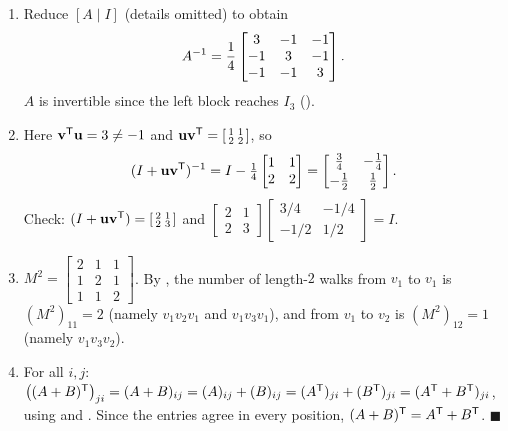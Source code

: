 \begin{enumerate}[label=\textbf{1.\arabic*},leftmargin=2.6em,itemsep=8pt]
\item Reduce $[A\mid I]$ (details omitted) to obtain
\[
A^{-1}=\frac14\begin{bmatrix}3&-1&-1\\-1&3&-1\\-1&-1&3\end{bmatrix}.
\]
$A$ is invertible since the left block reaches $I_3$ ().

\item Here $\mathbf{v}^{\mathsf{T}}\mathbf{u}=3\neq-1$ and $\mathbf{u}\mathbf{v}^{\mathsf{T}}=\left[\begin{smallmatrix}1&1\\2&2\end{smallmatrix}\right]$, so
\[
(I+\mathbf{u}\mathbf{v}^{\mathsf{T}})^{-1}=I-\tfrac14\begin{bmatrix}1&1\\2&2\end{bmatrix}=\begin{bmatrix}\tfrac34&-\tfrac14\\[2pt]-\tfrac12&\tfrac12\end{bmatrix}.
\]
Check: $(I+\mathbf{u}\mathbf{v}^{\mathsf{T}})=\left[\begin{smallmatrix}2&1\\2&3\end{smallmatrix}\right]$ and $\left[\begin{smallmatrix}2&1\\2&3\end{smallmatrix}\right]\left[\begin{smallmatrix}3/4&-1/4\\-1/2&1/2\end{smallmatrix}\right]=I$. \checkmark

\item $M^2=\left[\begin{smallmatrix}2&1&1\\1&2&1\\1&1&2\end{smallmatrix}\right]$. By , the number of length-$2$ walks from $v_1$ to $v_1$ is $(M^2)_{11}=2$ (namely $v_1v_2v_1$ and $v_1v_3v_1$), and from $v_1$ to $v_2$ is $(M^2)_{12}=1$ (namely $v_1v_3v_2$).

\item For all $i,j$: $\bigl((A+B)^{\mathsf{T}}\bigr)_{ji}=(A+B)_{ij}=(A)_{ij}+(B)_{ij}=(A^{\mathsf{T}})_{ji}+(B^{\mathsf{T}})_{ji}=(A^{\mathsf{T}}+B^{\mathsf{T}})_{ji}$, using  and . Since the entries agree in every position, $(A+B)^{\mathsf{T}}=A^{\mathsf{T}}+B^{\mathsf{T}}$. \;$\blacksquare$

\end{enumerate}
